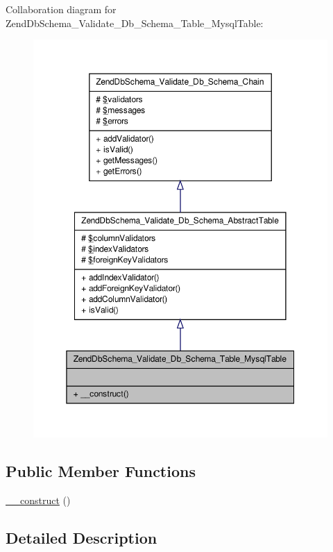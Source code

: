\-Collaboration diagram for \-Zend\-Db\-Schema\-\_\-\-Validate\-\_\-\-Db\-\_\-\-Schema\-\_\-\-Table\-\_\-\-Mysql\-Table\-:\nopagebreak
\begin{figure}[H]
\begin{center}
\leavevmode
\includegraphics[width=350pt]{classZendDbSchema__Validate__Db__Schema__Table__MysqlTable__coll__graph}
\end{center}
\end{figure}
\subsection*{\-Public \-Member \-Functions}
\begin{DoxyCompactItemize}
\item 
\hyperlink{classZendDbSchema__Validate__Db__Schema__Table__MysqlTable_a6698264143c29542e7ae48c467e0ed2c}{\-\_\-\-\_\-construct} ()
\end{DoxyCompactItemize}


\subsection{\-Detailed \-Description}


